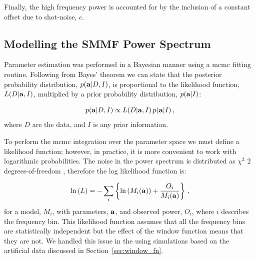 
Finally, the high frequency power is accounted for by the inclusion of a constant offset due to shot-noise, $c$.


\subsection{Modelling the SMMF Power Spectrum}
\label{sec:method_modelling}

Parameter estimation was performed in a Bayesian manner using a \gls{mcmc} fitting routine. Following from Bayes’ theorem we can state that the posterior probability distribution, $p({\bf a} | D, I)$, is proportional to the likelihood function, $L(D | {\bf a}, I)$, multiplied by a prior probability distribution, $p({\bf a} | I)$:

\begin{equation}
p({\bf a} | D, I) \propto L(D | {\bf a}, I) \, p({\bf a} | I) \, ,
\label{eq:bayes}
\end{equation}
%
where $D$ are the data, and $I$ is any prior information.

To perform the \gls{mcmc} integration over the parameter space we must define a likelihood function; however, in practice, it is more convenient to work with logarithmic probabilities. The noise in the power spectrum is distributed as $\chi^2$ 2 degrees-of-freedom \citep{handberg_bayesian_2011, davies_low-frequency_2014}, therefore the log likelihood function is:

\begin{equation}
\ln{(L)} = - \sum\limits_{i} \left\{ \ln{(M_{i}({\bf a}))} + \frac{O_i}{M_{i}({\bf a})} \right\} \, ,
\label{eq:likelihood_functino}
\end{equation}
%
for a model, $M_i$, with parameters, ${\bf a}$, and observed power, $O_i$, where $i$ describes the frequency bin. This likelihood function assumes that all the frequency bins are statistically independent but the effect of the window function means that they are not. We handled this issue in the using simulations based on the artificial data discussed in Section~\ref{sec:window_fn}.


